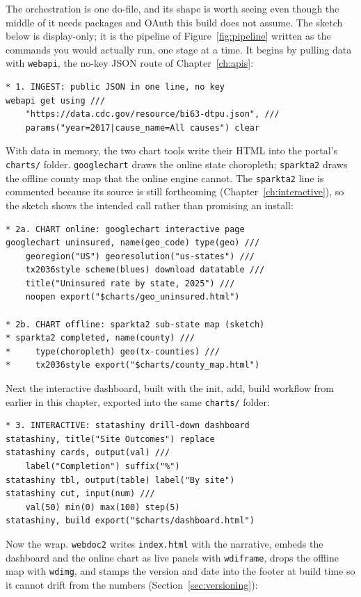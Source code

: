 \documentclass[
    a4paper,
    fontsize=10pt,
    twoside=true,
    numbers=noenddot,
]{kaobook}
\begin{document}
The orchestration is one do-file, and its shape is worth seeing even though the middle of it needs packages and OAuth this build does not assume. The sketch below is display-only; it is the pipeline of Figure~\ref{fig:pipeline} written as the commands you would actually run, one stage at a time. It begins by pulling data with \texttt{webapi}, the no-key JSON route of Chapter~\ref{ch:apis}:
{\footnotesize
\begin{verbatim}
* 1. INGEST: public JSON in one line, no key
webapi get using ///
    "https://data.cdc.gov/resource/bi63-dtpu.json", ///
    params("year=2017|cause_name=All causes") clear
\end{verbatim}
}
With data in memory, the two chart tools write their HTML into the portal's \texttt{charts/} folder. \texttt{googlechart} draws the online state choropleth; \texttt{sparkta2} draws the offline county map that the online engine cannot. The \texttt{sparkta2} line is commented because its source is still forthcoming (Chapter~\ref{ch:interactive}), so the sketch shows the intended call rather than promising an install:
{\footnotesize
\begin{verbatim}
* 2a. CHART online: googlechart interactive page
googlechart uninsured, name(geo_code) type(geo) ///
    georegion("US") georesolution("us-states") ///
    tx2036style scheme(blues) download datatable ///
    title("Uninsured rate by state, 2025") ///
    noopen export("$charts/geo_uninsured.html")

* 2b. CHART offline: sparkta2 sub-state map (sketch)
* sparkta2 completed, name(county) ///
*     type(choropleth) geo(tx-counties) ///
*     tx2036style export("$charts/county_map.html")
\end{verbatim}
}
Next the interactive dashboard, built with the init, add, build workflow from earlier in this chapter, exported into the same \texttt{charts/} folder:
{\footnotesize
\begin{verbatim}
* 3. INTERACTIVE: statashiny drill-down dashboard
statashiny, title("Site Outcomes") replace
statashiny cards, output(val) ///
    label("Completion") suffix("%")
statashiny tbl, output(table) label("By site")
statashiny cut, input(num) ///
    val(50) min(0) max(100) step(5)
statashiny, build export("$charts/dashboard.html")
\end{verbatim}
}
Now the wrap. \texttt{webdoc2} writes \texttt{index.html} with the narrative, embeds the dashboard and the online chart as live panels with \texttt{wdiframe}, drops the offline map with \texttt{wdimg}, and stamps the version and date into the footer at build time so it cannot drift from the numbers (Section~\ref{sec:versioning}):
\end{document}
